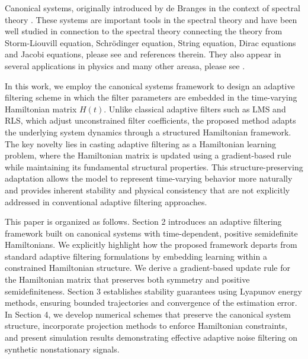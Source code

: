 \documentclass[reqno]{amsart}
\numberwithin{equation}{section}
\begin{document}
Canonical systems, originally introduced by de Branges in the context of spectral theory \cite{debranges1968canonical}. These systems are important tools in the spectral theory and have been well studied in connection to the spectral theory connecting the theory from Storm-Liouvill equation, Schr\"odinger equation, String equation, Dirac equations and Jacobi equations, please see \cite {Acharya2016, Remling2018, Sakhnovich1999} and references therein. They also appear in several applications  in physics and many other areasa, please see \cite{LuduAcharya2021}.


In this work, we employ the canonical systems framework to design an adaptive filtering scheme in which the filter parameters are embedded in the time-varying Hamiltonian matrix \(H(t)\).  Unlike classical adaptive filters such as LMS and RLS, which adjust unconstrained filter coefficients, the proposed method adapts the underlying system dynamics through a structured Hamiltonian framework. The key novelty lies in casting adaptive filtering as a Hamiltonian learning problem, where the Hamiltonian matrix is updated using a gradient-based rule while maintaining its fundamental structural properties. 
This structure-preserving adaptation allows the model to represent time-varying behavior more naturally and provides inherent stability and physical consistency that are not explicitly addressed in conventional adaptive filtering approaches. 


This paper is organized as follows.
Section 2 introduces an adaptive filtering framework built on canonical systems with time-dependent, positive semidefinite Hamiltonians.  We explicitly highlight how the proposed framework departs from standard adaptive filtering formulations by embedding learning within a constrained Hamiltonian structure. We derive a gradient-based update rule for the Hamiltonian matrix that preserves both symmetry and positive semidefiniteness. Section 3 establishes stability guarantees using Lyapunov energy methods, ensuring bounded trajectories and convergence of the estimation error.
In Section 4, we develop numerical schemes that preserve the canonical system structure, incorporate projection methods to enforce Hamiltonian constraints, and present simulation results demonstrating effective adaptive noise filtering on synthetic nonstationary signals.
\end{document}
